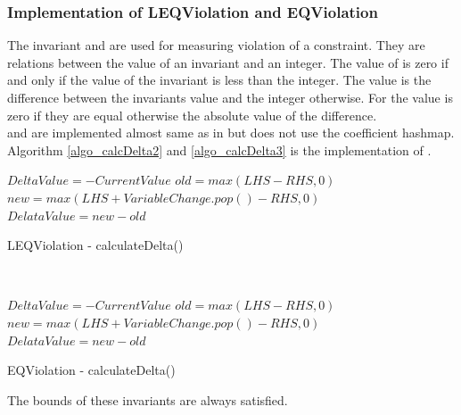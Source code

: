 \subsubsection{Implementation of LEQViolation and EQViolation}
The invariant  and  are used for measuring violation of a constraint. They are
relations between the value of an invariant and an integer. The value of  is zero if and only if 
the value of the invariant is less than the integer. The value is the difference between the invariants value and the 
integer otherwise. For  the value is zero if they are equal otherwise the absolute value of 
the difference. \\ 
 and  are implemented almost same as in  but 
 does not use the coefficient hashmap. \\ 
Algorithm \ref{algo_calcDelta2} and \ref{algo_calcDelta3} is the implementation of . \\ 
\IncMargin{1em}
\begin{algorithm}[H]

  \algdata
{}
\BlankLine
     {
    $DeltaValue = -CurrentValue $\;
    }{
      \int $old = max(LHS-RHS,0) $\;
      \int $new = max(LHS+VariableChange.pop() - RHS,0) $\;
      $DelataValue = new-old $\;
    }
    \Return \true \;
\caption{LEQViolation - calculateDelta()} \label{algo_calcDelta2} 
\end{algorithm} \noindent
\DecMargin{1em} \\

\IncMargin{1em}
\begin{algorithm}[H]

  \algdata
{}
\BlankLine
     {
    $DeltaValue = -CurrentValue $\;
    }{
      \int $old = max(LHS-RHS,0) $\;
      \int $new = max(LHS+VariableChange.pop() - RHS,0) $\;
      $DelataValue = new-old $\;
    }
    \Return \true \;
\caption{EQViolation - calculateDelta()} \label{algo_calcDelta3} 
\end{algorithm} \noindent
\DecMargin{1em} 
The bounds of these invariants are always satisfied. 

